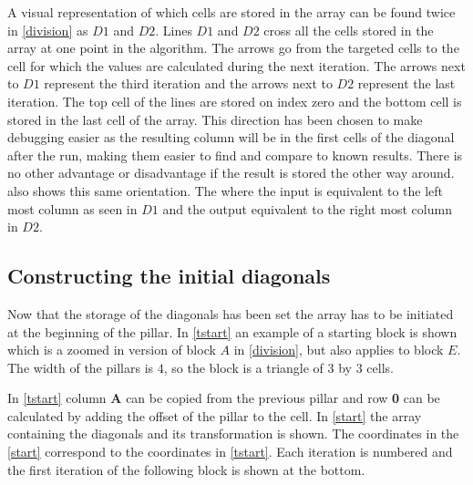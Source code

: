 A visual representation of which cells are stored in the array can be found twice in \cref{division} as $D1$ and $D2$.
Lines $D1$ and $D2$ cross all the cells stored in the array at one point in the algorithm.
The arrows go from the targeted cells to the cell for which the values are calculated during the next iteration.
The arrows next to $D1$ represent the third iteration and the arrows next to $D2$ represent the last iteration.
The top cell of the lines are stored on index zero and the bottom cell is stored in the last cell of the array.
This direction has been chosen to make debugging easier as the resulting column will be in the first cells of the diagonal after the run, making them easier to find and compare to known results.
There is no other advantage or disadvantage if the result is stored the other way around.
 also shows this same orientation.
The where the input is equivalent to the left most column as seen in $D1$ and the output equivalent to the right most column in $D2$.




\subsection{Constructing the initial diagonals} \label{section:initial}
Now that the storage of the diagonals has been set the array has to be initiated at the beginning of the pillar.
In \cref{tstart} an example of a starting block is shown which is a zoomed in version of block $A$ in \cref{division}, but also applies to block $E$.
The width of the pillars is $4$, so the block is a triangle of $3$ by $3$ cells.

In \cref{tstart} column \textbf{A} can be copied from the previous pillar and row \textbf{0} can be calculated by adding the offset of the pillar to the cell.
In \cref{start} the array containing the diagonals and its transformation is shown.
The coordinates in the \cref{start} correspond to the coordinates in \cref{tstart}.
Each iteration is numbered and the first iteration of the following block is shown at the bottom.

